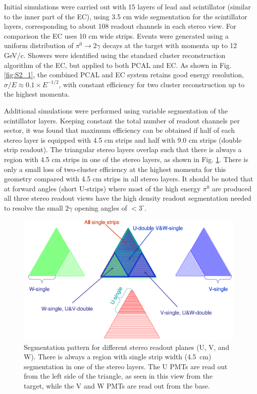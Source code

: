 Initial simulations were carried out with 15 layers of lead and scintillator (similar to the inner part of the EC), using 3.5 cm wide segmentation for the scintillator layers, corresponding to about 108 readout channels in each stereo view. For comparison the EC uses 10 cm wide strips.  Events were generated using a uniform distribution of $\pi^{0}\rightarrow 2\gamma$ decays at the target with momenta up to 12 GeV/c.  Showers were identified using the standard cluster reconstruction algorithm of the EC, but applied to both PCAL and EC. As shown in Fig. \ref{fig:S2_1}, the combined PCAL and EC system retains good energy resolution, $\sigma/E \approx 0.1 \times E^{-1/2}$, with constant efficiency for two cluster reconstruction up to the highest momenta.

Additional simulations were performed using variable segmentation of the scintillator layers. Keeping constant the total number of readout channels per sector, it was found that maximum efficiency can be obtained if half of each stereo layer is equipped with 4.5 cm strips and half with 9.0 cm strips (double strip readout). The triangular stereo layers overlap such that there is always a region with 4.5 cm strips in one of the stereo layers, as shown in Fig. \ref{fig:S2_2}. There is only a small loss of two-cluster efficiency at the highest momenta for this geometry compared with 4.5 cm strips in all stereo layers. It should be noted that at forward angles (short U-strips) where most of the high energy $\pi^{0}$ are produced all three stereo readout views have the high density readout segmentation needed to resolve the small $2\gamma$ opening angles of $<3^{\circ}$.

\begin{figure}[hbt]
\centering
\includegraphics[width=0.95\columnwidth,keepaspectratio]{img/S2_2.png}
\caption{Segmentation pattern for different stereo readout planes (U, V, and W). There is always a region with single strip width (4.5~cm) segmentation in one of the stereo layers.  The U PMTs are read out from the left side of the triangle, as seen in this view from the target, while the V and W PMTs are read out from the base.}
\label{fig:S2_2}
\end{figure}



